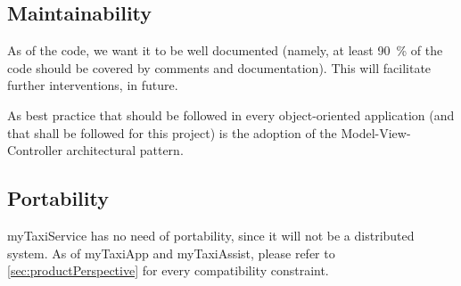 \subsection{Maintainability}
As of the code, we want it to be well documented (namely, at least \SI{90}{\percent} of the code should be covered by comments and documentation). This will facilitate further interventions, in future. 

As best practice that should be followed in every object-oriented application (and that shall be followed for this project) is the adoption of the Model-View-Controller architectural pattern. 


\subsection{Portability}
myTaxiService has no need of portability, since it will not be a distributed system. As of myTaxiApp and myTaxiAssist, please refer to \cref{sec:productPerspective} for every compatibility constraint.


